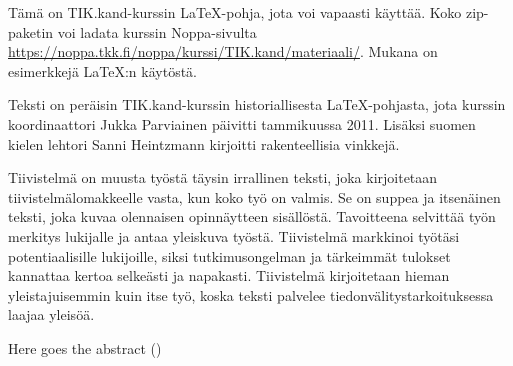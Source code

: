 %
%

\begin{fiabstract}
  Tämä on TIK.kand-kurssin \LaTeX{}-pohja, jota voi vapaasti
  käyttää. Koko zip-paketin voi ladata kurssin Noppa-sivulta
  \url{https://noppa.tkk.fi/noppa/kurssi/TIK.kand/materiaali/}.
  Mukana on esimerkkejä \LaTeX{}:n käytöstä.

  Teksti on peräisin TIK.kand-kurssin historiallisesta
  \LaTeX{}-pohjasta, jota kurssin koordinaattori Jukka Parviainen
  päivitti tammikuussa 2011.  Lisäksi suomen kielen lehtori Sanni
  Heintzmann kirjoitti rakenteellisia vinkkejä.

  Tiivistelmä on muusta työstä täysin irrallinen teksti, joka
  kirjoitetaan tiivistelmälomakkeelle vasta, kun koko työ on
  valmis. Se on suppea ja itsenäinen teksti, joka kuvaa olennaisen
  opinnäytteen sisällöstä. Tavoitteena selvittää työn merkitys
  lukijalle ja antaa yleiskuva työstä. Tiivistelmä markkinoi työtäsi
  potentiaalisille lukijoille, siksi tutkimusongelman ja tärkeimmät
  tulokset kannattaa kertoa selkeästi ja napakasti. Tiivistelmä
  kirjoitetaan hieman yleistajuisemmin kuin itse työ, koska teksti
  palvelee tiedonvälitystarkoituksessa laajaa yleisöä.

\end{fiabstract}


\begin{enabstract}
  Here goes the abstract 
(\languagename)
\end{enabstract}
